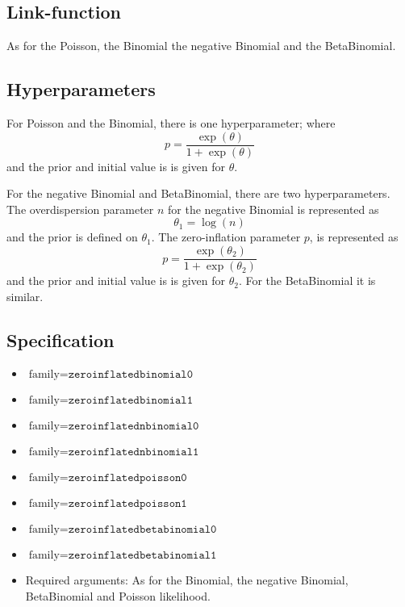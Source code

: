 \documentclass[a4paper,11pt]{article}
\begin{document}
\subsection*{Link-function}

As for the Poisson, the Binomial the negative Binomial and the BetaBinomial.

\subsection*{Hyperparameters}

For Poisson and the Binomial, there is one hyperparameter; where
\begin{displaymath}
    p = \frac{\exp(\theta)}{1+\exp(\theta)}
\end{displaymath}
and the prior and initial value is is given for $\theta$.

For the negative Binomial and BetaBinomial, there are two
hyperparameters.  The overdispersion parameter $n$ for the negative
Binomial is represented as
\begin{displaymath}
    \theta_{1} = \log(n)
\end{displaymath}
and the prior is defined on $\theta_{1}$. The zero-inflation parameter
$p$, is represented as
\begin{displaymath}
    p = \frac{\exp(\theta_{2})}{1+\exp(\theta_{2})}
\end{displaymath}
and the prior and initial value is is given for $\theta_{2}$. For the
BetaBinomial it is similar.

\subsection*{Specification}

\begin{itemize}
\item $\text{family}=\texttt{zeroinflatedbinomial0}$
\item $\text{family}=\texttt{zeroinflatedbinomial1}$
\item $\text{family}=\texttt{zeroinflatednbinomial0}$
\item $\text{family}=\texttt{zeroinflatednbinomial1}$
\item $\text{family}=\texttt{zeroinflatedpoisson0}$
\item $\text{family}=\texttt{zeroinflatedpoisson1}$
\item $\text{family}=\texttt{zeroinflatedbetabinomial0}$
\item $\text{family}=\texttt{zeroinflatedbetabinomial1}$
\item Required arguments: As for the Binomial, the negative Binomial,
    BetaBinomial and Poisson likelihood.
\end{itemize}
\end{document}
